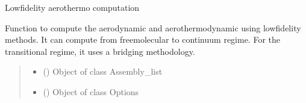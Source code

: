 \documentclass[letterpaper,10pt,english]{sphinxmanual}
\begin{document}
\begin{fulllineitems}
\label{\detokenize{modules:aerothermo.compute_low_fidelity_aerothermo}}
\pysigstartsignatures
{}
\pysigstopsignatures
\sphinxAtStartPar
Low\sphinxhyphen{}fidelity aerothermo computation

\sphinxAtStartPar
Function to compute the aerodynamic and aerothermodynamic using low\sphinxhyphen{}fidelity methods.
It can compute from free\sphinxhyphen{}molecular to continuum regime. For the transitional regime, it uses a bridging methodology.
\begin{quote}\begin{description}
\begin{itemize}
\item {} 
\sphinxAtStartPar
{} ({\hyperref[\detokenize{modules:assembly.Assembly_list}]{}}) \textendash{} Object of class Assembly\_list

\item {} 
\sphinxAtStartPar
{} ({\hyperref[\detokenize{modules:configuration.Options}]{}}) \textendash{} Object of class Options

\end{itemize}

\end{description}\end{quote}

\end{fulllineitems}

\end{document}
